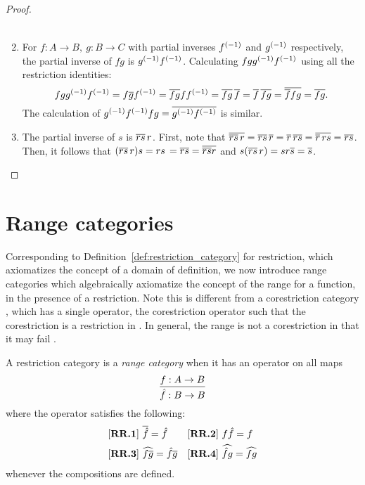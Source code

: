 \begin{proof}
\begin{enumerate}[{(}i{)}]
\begin{multline*}
      \end{multline*}
    \item For $f:A\to B,\ g:B\to C$ with partial inverses ${f}^{(-1)}$ and ${g}^{(-1)}$ respectively,
      the partial inverse of $f g$ is ${g}^{(-1)} {f}^{(-1)}$. Calculating $f g {g}^{(-1)} {f}^{(-1)}$
      using all the restriction identities:
      \[
        f g {g}^{(-1)} {f}^{(-1)} = f \overline{g} {f}^{(-1)} = \overline{f g} f {f}^{(-1)} =
        \overline{f g}\, \overline{f} = \overline{f}\, \overline{f g} = \overline{\overline{f} f g} = \overline{f g}.
      \]
      The calculation of ${g}^{(-1)} {f}^{(-1)} f g = \overline{{g}^{(-1)} {f}^{(-1)}}$ is similar.
    \item The partial inverse of $s$ is $\overline{r s}\,r$. First, note
      that $\overline{\overline{r s}\,r}
      = \overline{r s}\,\overline{r}
      = \overline{r}\, \overline{r s}
      = \overline{\overline{r}\,r s}
      = \overline{r s}$.
      Then, it follows that $(\overline{r s}\,r) s
      = r s\,= \overline{r s}
      = \overline{\overline{r s}r} $ and
      $s (\restr{r s}\,r)
      = s r \restr{s} %
      = \restr{s}$.
  \end{enumerate}
\end{proof}


\section{Range categories} %
\label{sub:range_categories}
Corresponding to Definition~\ref{def:restriction_category} for restriction, which axiomatizes the
concept of a domain of definition, we now introduce range categories
\cite{guox:thesis,cockett-guo-hofstra-2012:range,cockett-guo-hofstra-2012:range2}
which algebraically axiomatize the concept of the range for a function, in the presence of a
restriction. Note this is different from a corestriction category \Y, which has a single operator, the
corestriction operator such that the corestriction is a restriction in \dual{\Y}. In general, the
range is not a corestriction in that it may fail .

\begin{definition}\label{def:range_category}
  A restriction category \X is a \emph{range category} when it has an operator on all maps
  \[
    \infer{\rg{f}:B\to B}{f:A\to B}
  \]
  where the operator satisfies the following:
  \begin{align*}
    &[\text{\bfseries {RR}.{1}}]\ \overline{\hat{f}} = \hat{f} & &
     [\text{\bfseries {RR}.{2}}]\ f \hat{f} = f\\
    &[\text{\bfseries {RR}.{3}}]\ \widehat{f\overline{g}} = \hat{f} \overline{g} & &
     [\text{\bfseries {RR}.{4}}]\  \widehat{\hat{f}g} = \widehat{f g}
  \end{align*}
  whenever the compositions are defined.

\end{definition}

